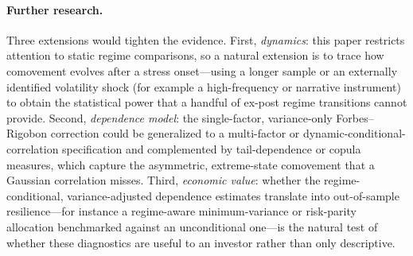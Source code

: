 \paragraph{Further research.} Three extensions would tighten the evidence. First, \emph{dynamics}: this paper restricts attention to static regime comparisons, so a natural extension is to trace how comovement evolves after a stress onset---using a longer sample or an externally identified volatility shock (for example a high-frequency or narrative instrument) to obtain the statistical power that a handful of ex-post regime transitions cannot provide. Second, \emph{dependence model}: the single-factor, variance-only Forbes--Rigobon correction could be generalized to a multi-factor or dynamic-conditional-correlation specification and complemented by tail-dependence or copula measures, which capture the asymmetric, extreme-state comovement that a Gaussian correlation misses. Third, \emph{economic value}: whether the regime-conditional, variance-adjusted dependence estimates translate into out-of-sample resilience---for instance a regime-aware minimum-variance or risk-parity allocation benchmarked against an unconditional one---is the natural test of whether these diagnostics are useful to an investor rather than only descriptive.
